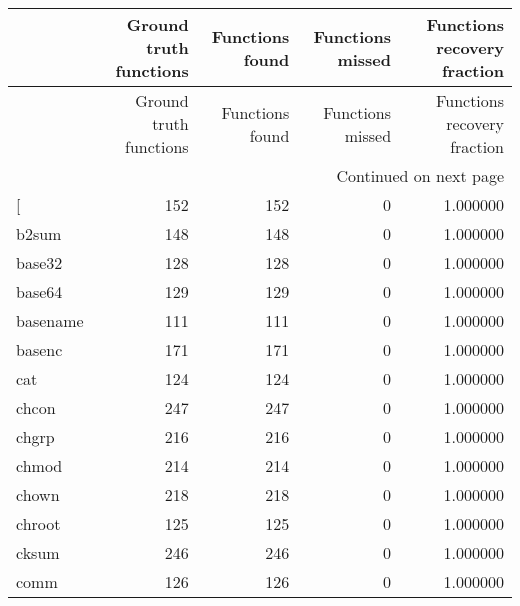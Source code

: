 \begin{longtable}{lrrrr}
\toprule
{} &  Ground truth functions &  Functions found &  Functions missed &  Functions recovery fraction \\
\midrule
\endfirsthead

\toprule
{} &  Ground truth functions &  Functions found &  Functions missed &  Functions recovery fraction \\
\midrule
\endhead
\midrule
\multicolumn{5}{r}{{Continued on next page}} \\
\midrule
\endfoot

\bottomrule
\endlastfoot
{[}         &                     152 &              152 &                 0 &                     1.000000 \\
b2sum     &                     148 &              148 &                 0 &                     1.000000 \\
base32    &                     128 &              128 &                 0 &                     1.000000 \\
base64    &                     129 &              129 &                 0 &                     1.000000 \\
basename  &                     111 &              111 &                 0 &                     1.000000 \\
basenc    &                     171 &              171 &                 0 &                     1.000000 \\
cat       &                     124 &              124 &                 0 &                     1.000000 \\
chcon     &                     247 &              247 &                 0 &                     1.000000 \\
chgrp     &                     216 &              216 &                 0 &                     1.000000 \\
chmod     &                     214 &              214 &                 0 &                     1.000000 \\
chown     &                     218 &              218 &                 0 &                     1.000000 \\
chroot    &                     125 &              125 &                 0 &                     1.000000 \\
cksum     &                     246 &              246 &                 0 &                     1.000000 \\
comm      &                     126 &              126 &                 0 &                     1.000000 \\

\end{longtable}
